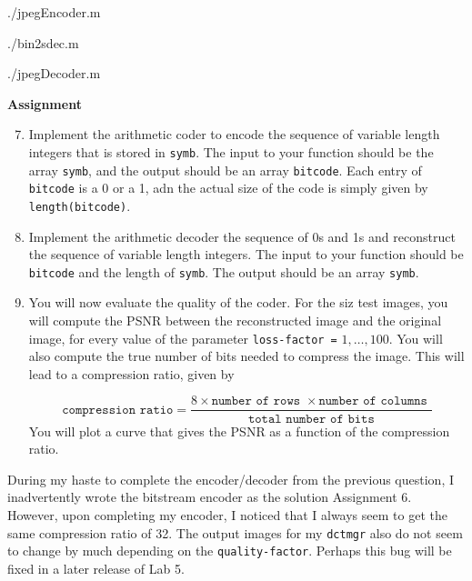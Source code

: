 \documentclass{article} %
\begin{document}

{./jpegEncoder.m}

{./bin2sdec.m}  

{./jpegDecoder.m}  


\begin{framed}
\textbf{Assignment}
\begin{enumerate}
\setcounter{enumi}{6}
\item Implement the arithmetic coder to encode the sequence of variable length integers that is stored in \verb|symb|. 
The input to your function should be the array \verb|symb|, and the output should be an array \verb|bitcode|. 
Each entry of \verb|bitcode| is a 0 or a 1, adn the actual size of the code is simply given by \verb|length(bitcode)|. 

\item Implement the arithmetic decoder the sequence of 0s and 1s and reconstruct the sequence of variable length
integers. The input to your function should be \verb|bitcode| and the length of \verb|symb|. The output should be an array \verb|symb|. 

\item You will now evaluate the quality of the coder. For the siz test images, you will compute the PSNR between the 
reconstructed image and the original image, for every value of the parameter \verb|loss-factor =| $1,\dots,100$. You will also
compute the true number of bits needed to compress the image. This will lead to a compression ratio, given by

\begin{equation}
\texttt{compression ratio} = \frac{8 \times \texttt{number of rows } \times \texttt{number of columns }}{\texttt{total number of bits}}
\end{equation}
You will plot a curve that gives the PSNR as a function of the compression ratio. 
\end{enumerate}
\end{framed}


During my haste to complete the encoder/decoder from the previous question, I inadvertently wrote the bitstream encoder as the solution
Assignment 6. However, upon completing my encoder, I noticed that I always seem to get the same compression ratio of 32. 
The output images for my \verb|dctmgr| also do not seem to change by much depending on the \verb|quality-factor|. 
Perhaps this bug will be fixed in a later release of Lab 5. 
\end{document}
